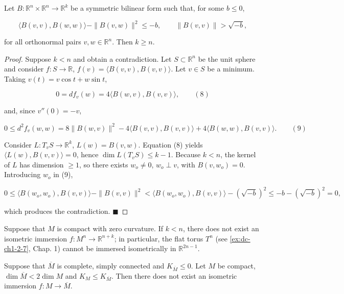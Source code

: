 \begin{lemma}[Otsuki]
  \label{lem:dc-ch10-3-3}
  Let $B:\mathbb{R}^n\times\mathbb{R}^n\to\mathbb{R}^k$ be a symmetric bilinear form
  such that, for some $b\leq 0$,
  
  $$
  \langle B(v,v),B(w,w)\rangle-\|B(v,w)\|^2\leq -b,\qquad\|B(v,v)\|>\sqrt{-b},
  $$
  
  for all orthonormal pairs $v,w\in\mathbb{R}^n$. Then $k\geq n$.
\end{lemma}
\begin{proof}
  Suppose $k<n$ and obtain a contradiction. Let $S\subset\mathbb{R}^n$ be
  the unit sphere and consider $f:S\to\mathbb{R}$, $f(v)=\langle B(v,v),B(v,v)\rangle$.
  Let $v\in S$ be a minimum. Taking $v(t)=v\cos t+w\sin t$,
  
  $$
  0=df_v(w)=4\langle B(w,v),B(v,v)\rangle,\qquad(8)
  $$
  
  and, since $v''(0)=-v$,
  
  $$
  0\leq d^2f_v(w,w)=8\|B(w,v)\|^2-4\langle B(v,v),B(v,v)\rangle+4\langle B(w,w),B(v,v)\rangle.\qquad(9)
  $$
  
  Consider $L:T_vS\to\mathbb{R}^k$, $L(w)=B(v,w)$. Equation (8) yields
  $\langle L(w),B(v,v)\rangle=0$, hence $\dim L(T_vS)\leq k-1$. Because $k<n$, the
  kernel of $L$ has dimension $\geq 1$, so there exists $w_o\neq 0$, $w_o\perp v$,
  with $B(v,w_o)=0$. Introducing $w_o$ in (9),
  
  $$
  0\leq\langle B(w_o,w_o),B(v,v)\rangle-\|B(v,v)\|^2<\langle B(w_o,w_o),B(v,v)\rangle-(\sqrt{-b})^2\leq -b-(\sqrt{-b})^2=0,
  $$
  
  which produces the contradiction. $\blacksquare$
\end{proof}

\begin{corollary}[C. Tompkins]
  \label{cor:dc-ch10-3-4}
  Suppose that $M$ is compact with zero curvature. If $k<n$, there does not exist
  an isometric immersion $f:M^n\to\mathbb{R}^{n+k}$; in particular, the flat torus
  $T^n$ (see \cref{ex:dc-ch1-2-7}, Chap. 1) cannot be immersed isometrically in $\mathbb{R}^{2n-1}$.
\end{corollary}

\begin{corollary}[B. O'Neill]
  \label{cor:dc-ch10-3-5}
  Suppose that $\overline{M}$ is complete, simply connected and $K_{\overline{M}}\leq 0$.
  Let $M$ be compact, $\dim\overline{M}<2\dim M$ and $K_M\leq K_{\overline{M}}$.
  Then there does not exist an isometric immersion $f:M\to\overline{M}$.
\end{corollary}

